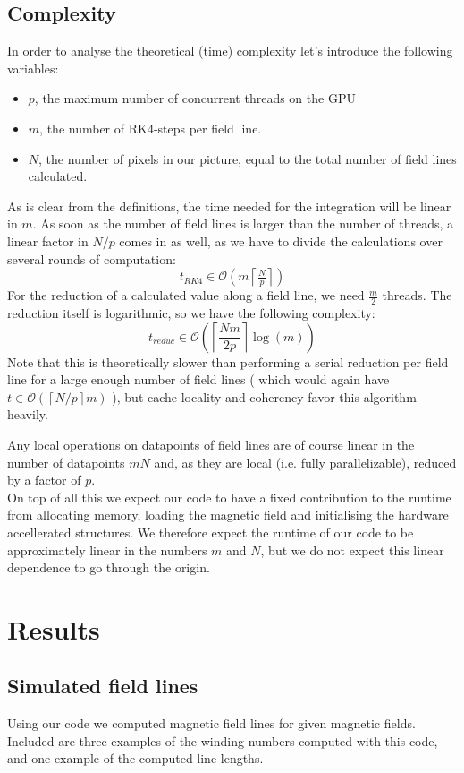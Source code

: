 \documentclass[a4paper]{article}
\renewcommand{\O}[1]{\ensuremath{\mathcal{O}\left(#1\right)}}
\begin{document}
\subsection{Complexity}
In order to analyse the theoretical (time) complexity let's introduce the following variables:
\begin{itemize}
	\item $p$, the maximum number of concurrent threads on the GPU
	\item $m$, the number of RK4-steps per field line.
	\item $N$, the number of pixels in our picture, equal to the total number of field lines calculated.
\end{itemize}
As is clear from the definitions, the time needed for the integration will be linear in $m$. As soon as the number of field lines is larger than the number of threads, a linear factor in $N/p$ comes in as well, as we have to divide the calculations over several rounds of computation:
\[t_{RK4}\in\O{m\left\lceil\tfrac{N}{p}\right\rceil}\]
For the reduction of a calculated value along a field line, we need $\frac m2$ threads. The reduction itself is logarithmic, so we have the following complexity:
\[t_\textit{reduc} \in \O{\left\lceil\frac{Nm}{2p}\right\rceil\log\left(m\right)} \]
Note that this is theoretically slower than performing a serial reduction per field line for a large enough number of field lines ( which would again have $t \in \O{\left\lceil N/p\right\rceil m}$ ), but cache locality and coherency favor this algorithm heavily.

Any local operations on datapoints of field lines are of course linear in the number of datapoints $mN$ and, as they are local (i.e. fully parallelizable), reduced by a factor of $p$.\\
On top of all this we expect our code to have a fixed contribution to the runtime from allocating memory, loading the magnetic field and initialising the hardware accellerated structures. We therefore expect the runtime of our code to be approximately linear in the numbers $m$ and $N$, but we do not expect this linear dependence to go through the origin.
\newpage
\section{Results}
\subsection{Simulated field lines}
Using our code we computed magnetic field lines for given magnetic fields. Included are three examples of the winding numbers computed with this code, and one example of the computed line lengths.
\end{document}
